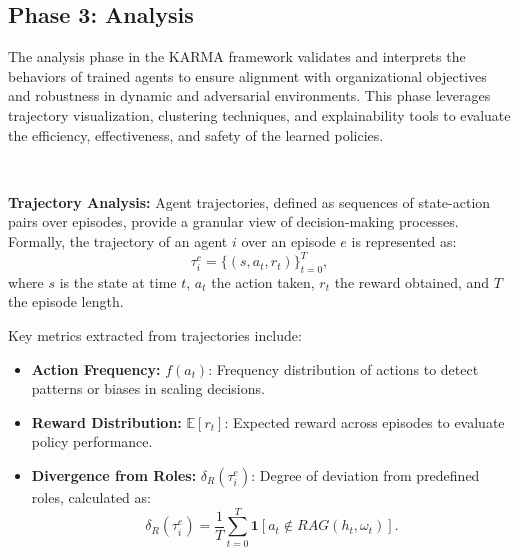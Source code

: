 \documentclass[conference]{IEEEtran}
\begin{document}
\subsection{Phase 3: Analysis}

The analysis phase in the KARMA framework validates and interprets the behaviors of trained agents to ensure alignment with organizational objectives and robustness in dynamic and adversarial environments. This phase leverages trajectory visualization, clustering techniques, and explainability tools to evaluate the efficiency, effectiveness, and safety of the learned policies.

\

\noindent\textbf{Trajectory Analysis:} 
Agent trajectories, defined as sequences of state-action pairs over episodes, provide a granular view of decision-making processes. Formally, the trajectory of an agent $i$ over an episode $e$ is represented as:
\[
\tau_i^e = \{(s, a_t, r_t)\}_{t=0}^{T},
\]
where $s$ is the state at time $t$, $a_t$ the action taken, $r_t$ the reward obtained, and $T$ the episode length.

Key metrics extracted from trajectories include:
\begin{itemize}
    \item \textbf{Action Frequency:} $f(a_t)$: Frequency distribution of actions to detect patterns or biases in scaling decisions.
    \item \textbf{Reward Distribution:} $\mathbb{E}[r_t]$: Expected reward across episodes to evaluate policy performance.
    \item \textbf{Divergence from Roles:} $\delta_R(\tau_i^e)$: Degree of deviation from predefined roles, calculated as:
    \[
    \delta_R(\tau_i^e) = \frac{1}{T} \sum_{t=0}^T \mathbf{1}[a_t \notin RAG(h_t, \omega_t)].
    \]
\end{itemize}
\end{document}
